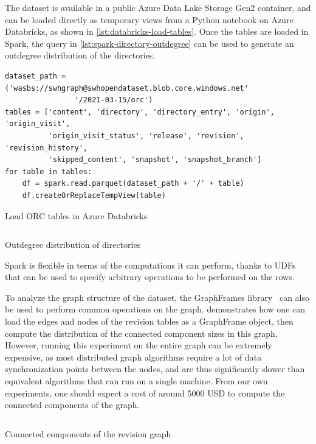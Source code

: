 The dataset is available in a public Azure Data Lake Storage Gen2 container,
and can be loaded directly as temporary views from a Python notebook on Azure
Databricks, as shown in \cref{lst:databricks-load-tables}.
Once the tables are loaded in Spark, the query in
\cref{lst:spark-directory-outdegree} can be used to generate an
outdegree distribution of the directories.

\begin{listing}
\begin{verbatim}
dataset_path = ('wasbs://swhgraph@swhopendataset.blob.core.windows.net'
                '/2021-03-15/orc')
tables = ['content', 'directory', 'directory_entry', 'origin', 'origin_visit',
          'origin_visit_status', 'release', 'revision', 'revision_history',
          'skipped_content', 'snapshot', 'snapshot_branch']
for table in tables:
    df = spark.read.parquet(dataset_path + '/' + table)
    df.createOrReplaceTempView(table)
\end{verbatim}
\caption{Load ORC tables in Azure Databricks}%
\label{lst:databricks-load-tables}
\end{listing}

\begin{listing}
    \inputminted{sql}{codesamples/graph-dataset/spark-degree.sql}
    \caption{Outdegree distribution of directories}%
    \label{lst:spark-directory-outdegree}
\end{listing}

Spark is flexible in terms of the computations it can perform, thanks to
\glspl{UDF}~\cite{armbrust2015spark} that can be used to specify
arbitrary operations to be performed on the rows.

To analyze the graph structure of the dataset, the GraphFrames
library~\cite{dave2016graphframes} can also be used to perform common
operations on the graph.  demonstrates how one can load the
edges and nodes of the revision tables as a GraphFrame object, then compute the
distribution of the connected component sizes in this graph. However, running
this experiment on the entire graph can be extremely expensive, as most
distributed graph algorithms require a lot of data synchronization points
between the nodes, and are thus significantly slower than equivalent algorithms
that can run on a single machine. From our own experiments, one should expect a
cost of around \num{5000} USD to compute the connected components of the graph.

\begin{listing}
    \inputminted{python}{codesamples/graph-dataset/spark-cc.py}
    \caption{Connected components of the revision graph}%
    \label{lst:cc}
\end{listing}

